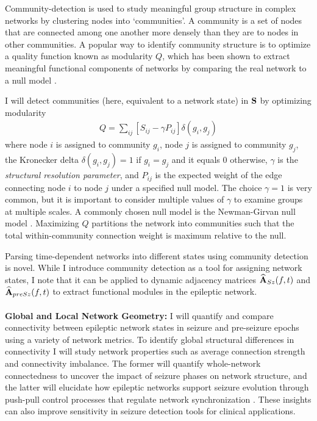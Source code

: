 Community-detection is used to study meaningful group structure in complex networks by clustering nodes into `communities'. A community is a set of nodes that are connected among one another more densely than they are to nodes in other communities. A popular way to identify community structure is to optimize a quality function known as modularity $Q$, which has been shown to extract meaningful functional components of networks by comparing the real network to a null model \cite{newman2004finding, newman2006modularity, porter2009communities, fortunato2010community}.

I will detect communities (here, equivalent to a network state) in $\mathbf{\displaystyle S}$ by optimizing modularity
\begin{eqnarray}
\label{eqn:modopt}
	Q = \sum_{ij} [S_{ij} - \gamma P_{ij}] \delta(g_{i},g_{j})
\end{eqnarray}
where node $i$ is assigned to community $g_{i}$, node $j$ is assigned to community $g_{j}$, the Kronecker delta $\delta(g_{i},g_{j})=1$ if $g_{i} = g_{j}$ and it equals $0$ otherwise, $\gamma$ is the \emph{structural resolution parameter}, and $P_{ij}$ is the expected weight of the edge connecting node $i$ to node $j$ under a specified null model. The choice $\gamma = 1$ is very common, but it is important to consider multiple values of $\gamma$ to examine groups at multiple scales. A commonly chosen null model is the Newman-Girvan null model \cite{porter2009communities, fortunato2010community, newman2004finding, newman2006modularity}.  Maximizing $Q$ partitions the network into communities such that the total within-community connection weight is maximum relative to the null.

Parsing time-dependent networks into different states using community detection is novel. While I introduce community detection as a tool for assigning network states, I note that it can be applied to dynamic adjacency matrices $\widehat{\mathbf{\displaystyle A}}_{Sz}(f,t)$ and $\widehat{\mathbf{\displaystyle A}}_{preSz}(f,t)$ to extract functional modules in the epileptic network.
~\\
~\\
\textbf{Global and Local Network Geometry:}
I will quantify and compare connectivity between epileptic network states in seizure and pre-seizure epochs using a variety of network metrics. To identify global structural differences in connectivity I will study network properties such as average connection strength and connectivity imbalance. The former will quantify whole-network connectedness to uncover the impact of seizure phases on network structure, and the latter will elucidate how epileptic networks support seizure evolution through push-pull control processes that regulate network synchronization \cite{he2014control}. These insights can also improve sensitivity in seizure detection tools for clinical applications.

